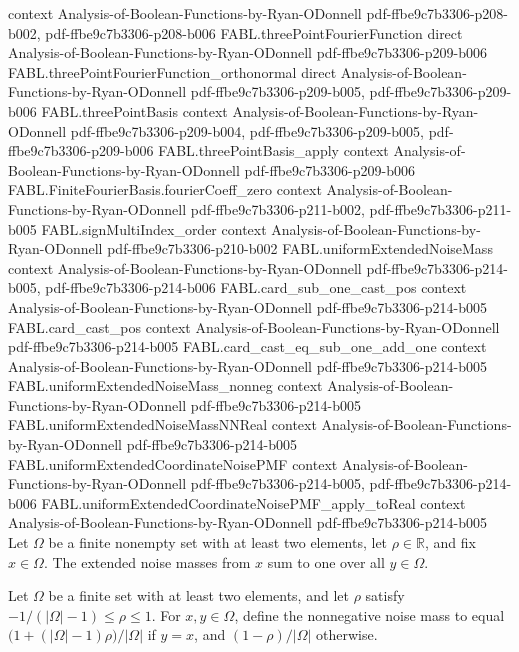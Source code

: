 \begin{theorem}
  {context}
  {Analysis-of-Boolean-Functions-by-Ryan-ODonnell}
  {pdf-ffbe9c7b3306-p208-b002,
    pdf-ffbe9c7b3306-p208-b006}
\proofstep
  {FABL.threePointFourierFunction}
  {direct}
  {Analysis-of-Boolean-Functions-by-Ryan-ODonnell}
  {pdf-ffbe9c7b3306-p209-b006}
\proofstep
  {FABL.threePointFourierFunction_orthonormal}
  {direct}
  {Analysis-of-Boolean-Functions-by-Ryan-ODonnell}
  {pdf-ffbe9c7b3306-p209-b005,
    pdf-ffbe9c7b3306-p209-b006}
\proofstep
  {FABL.threePointBasis}
  {context}
  {Analysis-of-Boolean-Functions-by-Ryan-ODonnell}
  {pdf-ffbe9c7b3306-p209-b004,
    pdf-ffbe9c7b3306-p209-b005,
    pdf-ffbe9c7b3306-p209-b006}
\proofstep
  {FABL.threePointBasis_apply}
  {context}
  {Analysis-of-Boolean-Functions-by-Ryan-ODonnell}
  {pdf-ffbe9c7b3306-p209-b006}
\proofstep
  {FABL.FiniteFourierBasis.fourierCoeff_zero}
  {context}
  {Analysis-of-Boolean-Functions-by-Ryan-ODonnell}
  {pdf-ffbe9c7b3306-p211-b002,
    pdf-ffbe9c7b3306-p211-b005}
\proofstep
  {FABL.signMultiIndex_order}
  {context}
  {Analysis-of-Boolean-Functions-by-Ryan-ODonnell}
  {pdf-ffbe9c7b3306-p210-b002}
\proofstep
  {FABL.uniformExtendedNoiseMass}
  {context}
  {Analysis-of-Boolean-Functions-by-Ryan-ODonnell}
  {pdf-ffbe9c7b3306-p214-b005,
    pdf-ffbe9c7b3306-p214-b006}
\proofstep
  {FABL.card_sub_one_cast_pos}
  {context}
  {Analysis-of-Boolean-Functions-by-Ryan-ODonnell}
  {pdf-ffbe9c7b3306-p214-b005}
\proofstep
  {FABL.card_cast_pos}
  {context}
  {Analysis-of-Boolean-Functions-by-Ryan-ODonnell}
  {pdf-ffbe9c7b3306-p214-b005}
\proofstep
  {FABL.card_cast_eq_sub_one_add_one}
  {context}
  {Analysis-of-Boolean-Functions-by-Ryan-ODonnell}
  {pdf-ffbe9c7b3306-p214-b005}
\proofstep
  {FABL.uniformExtendedNoiseMass_nonneg}
  {context}
  {Analysis-of-Boolean-Functions-by-Ryan-ODonnell}
  {pdf-ffbe9c7b3306-p214-b005}
\proofstep
  {FABL.uniformExtendedNoiseMassNNReal}
  {context}
  {Analysis-of-Boolean-Functions-by-Ryan-ODonnell}
  {pdf-ffbe9c7b3306-p214-b005}
\proofstep
  {FABL.uniformExtendedCoordinateNoisePMF}
  {context}
  {Analysis-of-Boolean-Functions-by-Ryan-ODonnell}
  {pdf-ffbe9c7b3306-p214-b005,
    pdf-ffbe9c7b3306-p214-b006}
\proofstep
  {FABL.uniformExtendedCoordinateNoisePMF_apply_toReal}
  {context}
  {Analysis-of-Boolean-Functions-by-Ryan-ODonnell}
  {pdf-ffbe9c7b3306-p214-b005}
Let $\Omega$ be a finite nonempty set with at least two elements, let $\rho\in\mathbb
R$, and fix $x\in\Omega$. The extended noise masses from $x$ sum to one over all
$y\in\Omega$.
\end{theorem}

\begin{definition}
\label{FABL.uniformExtendedNoiseMassNNReal}
\leanok
{}
Let $\Omega$ be a finite set with at least two elements, and let $\rho$ satisfy
$-1/(|\Omega|-1)\le \rho\le 1$. For $x,y\in\Omega$, define the nonnegative noise mass to
equal $\bigl(1+(|\Omega|-1)\rho\bigr)/|\Omega|$ if $y=x$, and $(1-\rho)/|\Omega|$
otherwise.
\end{definition}

